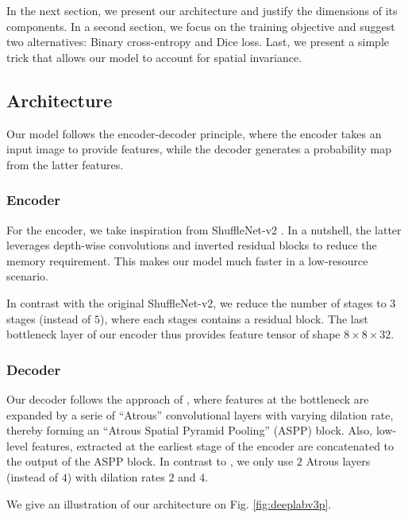 \documentclass[11pt]{article}
\begin{document}
In the next section, we present our architecture and justify the dimensions of
its components.
In a second section, we focus on the training objective and suggest two alternatives: Binary cross-entropy and Dice loss.
Last, we present a simple trick that allows our model to account for spatial invariance.

\subsection{Architecture}
\label{sec:orgc934c33}

Our model follows the encoder-decoder principle, where the encoder
takes an input image to provide
features, while the decoder generates a probability map from the latter features.

\subsubsection{Encoder}
\label{sec:org7453ba6}

For the encoder, we take inspiration from ShuffleNet-v2 \cite{ma18}.
In a nutshell, the latter leverages depth-wise convolutions and
inverted residual blocks to reduce the memory requirement.
This makes our model much faster in a low-resource scenario.

In contrast with the original ShuffleNet-v2, we reduce the number
of stages to \(3\) stages (instead of \(5\)), where each stages contains a
residual block.
The last bottleneck layer of our encoder thus provides feature tensor of shape \(8\times8\times32\).

\subsubsection{Decoder}
\label{sec:orge634ee9}

Our decoder follows the approach of \cite{chen18}, where features at the bottleneck
are expanded by a serie of ``Atrous'' convolutional layers with varying dilation rate, thereby forming an ``Atrous Spatial Pyramid Pooling'' (ASPP) block.
Also, low-level features, extracted at the earliest stage of the encoder are concatenated
to the output of the ASPP block.
In contrast to \cite{chen18}, we only use \(2\) Atrous layers (instead of \(4\)) with dilation
rates \(2\) and \(4\).

We give an illustration of our architecture on Fig. \ref{fig:deeplabv3p}.
\end{document}
